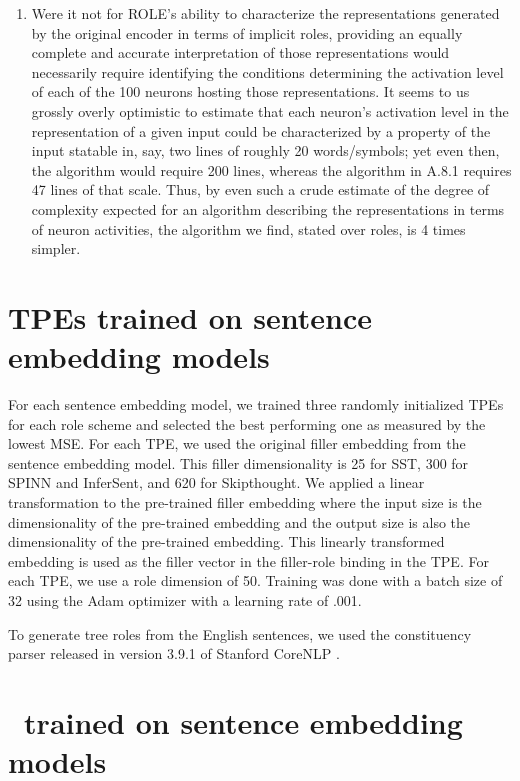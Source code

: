 \begin{enumerate}
\item
Were it not for ROLE’s ability to characterize the representations generated by the original encoder in terms of implicit roles, providing an equally complete and accurate interpretation of those representations would necessarily require identifying the conditions determining the activation level of each of the 100 neurons hosting those representations. It seems to us grossly overly optimistic to estimate that each neuron’s activation level in the representation of a given input could be characterized by a property of the input statable in, say, two lines of roughly 20 words/symbols; yet even then, the algorithm would require 200 lines, whereas the algorithm in A.8.1 requires 47 lines of that scale. Thus, by even such a crude estimate of the degree of complexity expected for an algorithm describing the representations in terms of neuron activities, the algorithm we find, stated over roles, is 4 times simpler.


\end{enumerate}

\section{TPEs trained on sentence embedding models} \label{sec:tpe-sentences}

For each sentence embedding model, we trained three randomly initialized TPEs for each role scheme and selected the best performing one as measured by the lowest MSE. For each TPE, we used the original filler embedding from the sentence embedding model. This filler dimensionality is 25 for SST, 300 for SPINN and InferSent, and 620 for Skipthought. We applied a linear transformation to the pre-trained filler embedding where the input size is the dimensionality of the pre-trained embedding and the output size is also the dimensionality of the pre-trained embedding. This linearly transformed embedding is used as the filler vector in the filler-role binding in the TPE. For each TPE, we use a role dimension of 50. Training was done with a batch size of 32 using the Adam optimizer with a learning rate of .001.

To generate tree roles from the English sentences, we used the constituency parser released in version 3.9.1 of Stanford CoreNLP \citep{klein2003accurate}.

\section{\RLN\ trained on sentence embedding models} \label{sec:role-sentences}

